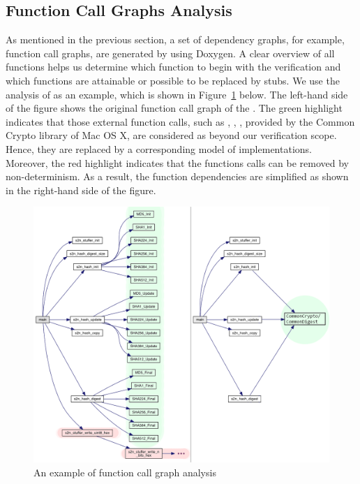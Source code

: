 \subsection{Function Call Graphs Analysis}
As mentioned in the previous section, a set of dependency graphs, for example, function call graphs, are generated by using Doxygen. A clear overview of all functions helps us determine which function to begin with the verification and which functions are attainable or possible to be replaced by stubs. We use the analysis of  as an example, which is shown in Figure~\ref{fig:aeoffcga} below. The left-hand side of the figure shows the original function call graph of the . The green highlight indicates that those external function calls, such as , , , provided by the Common Crypto library of Mac OS X, are considered as beyond our verification scope. Hence, they are replaced by a corresponding model of  implementations. Moreover, the red highlight indicates that the functions calls can be removed by non-determinism. As a result, the function dependencies are simplified as shown in the right-hand side of the figure. 

\begin{figure}[hpt]
    \centering
    \includegraphics[width=.8\textwidth]{./contents/images/s2n_hash_test}
    \caption{An example of function call graph analysis}
    \label{fig:aeoffcga}
\end{figure}

